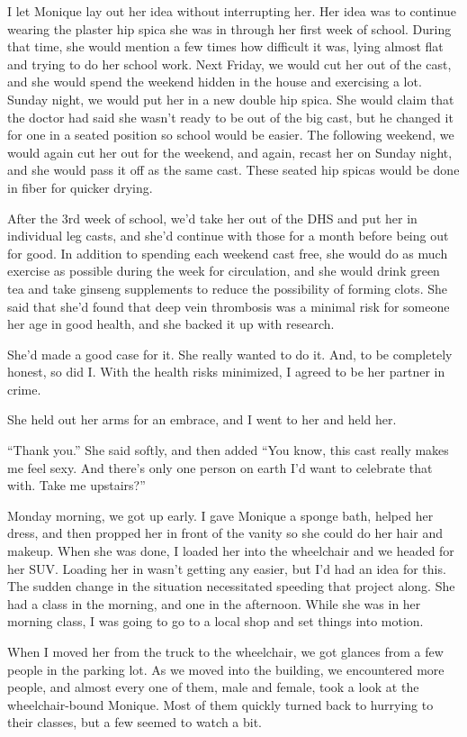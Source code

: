 I let Monique lay out her idea without interrupting her. Her idea was to continue wearing
the plaster hip spica she was in through her first week of school. During that time, she would
mention a few times how difficult it was, lying almost flat and trying to do her school work.
Next Friday, we would cut her out of the cast, and she would spend the weekend hidden in the
house and exercising a lot. Sunday night, we would put her in a new double hip spica. She would
claim that the doctor had said she wasn't ready to be out of the big cast, but he changed it for
one in a seated position so school would be easier. The following weekend, we would again cut
her out for the weekend, and again, recast her on Sunday night, and she would pass it off as the
same cast. These seated hip spicas would be done in fiber for quicker drying.

After the 3rd week of school, we'd take her out of the DHS and put her in individual leg
casts, and she'd continue with those for a month before being out for good. In addition to
spending each weekend cast free, she would do as much exercise as possible during the week for
circulation, and she would drink green tea and take ginseng supplements to reduce the
possibility of forming clots. She said that she'd found that deep vein thrombosis was a minimal
risk for someone her age in good health, and she backed it up with research.

She'd made a good case for it. She really wanted to do it. And, to be completely honest, so
did I. With the health risks minimized, I agreed to be her partner in crime.

She held out her arms for an embrace, and I went to her and held her.

``Thank you.'' She said softly, and then added ``You know, this cast really makes me feel
sexy. And there's only one person on earth I'd want to celebrate that with. Take me upstairs?''

Monday morning, we got up early. I gave Monique a sponge bath, helped her dress, and then
propped her in front of the vanity so she could do her hair and makeup. When she was done, I
loaded her into the wheelchair and we headed for her SUV. Loading her in wasn't getting any
easier, but I'd had an idea for this. The sudden change in the situation necessitated speeding
that project along. She had a class in the morning, and one in the afternoon. While she was in
her morning class, I was going to go to a local shop and set things into motion.

When I moved her from the truck to the wheelchair, we got glances from a few people in the
parking lot. As we moved into the building, we encountered more people, and almost every one of
them, male and female, took a look at the wheelchair-bound Monique. Most of them quickly turned
back to hurrying to their classes, but a few seemed to watch a bit.

